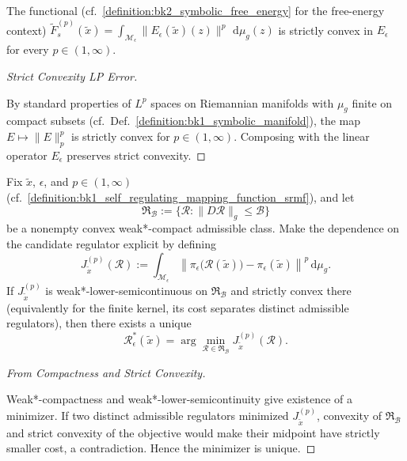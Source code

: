 \begin{lemma}
\label{lemma:bk7_coarsegrained_convexity}
The functional (cf.~\ref{definition:bk2_symbolic_free_energy} for the free-energy context)
\(
\tilde{F}_{s}^{(p)}(\tilde{x})
=\!\displaystyle \int_{\mathcal{M}_{\epsilon}}
\bigl\lVert E_{\epsilon}(\tilde{x})(z)\bigr\rVert^{p}\,
\,\mathrm{d}\mu_{g}(z)
\)
is strictly convex in $E_{\epsilon}$ for every $p\!\in\!(1,\infty)$.
\end{lemma}
\begin{proof}[Strict Convexity LP Error]
\label{proof:bk7_strict_convexity_lp_error}
\leavevmode

By standard properties of $L^{p}$ spaces on Riemannian manifolds with
$\mu_{g}$ finite on compact subsets (cf.~Def.~\ref{definition:bk1_symbolic_manifold}), the map
$E\!\mapsto\!\lVert E\rVert_{p}^{p}$ is strictly convex
for $p\!\in\!(1,\infty)$.  Composing with the linear operator
$E_{\epsilon}$ preserves strict convexity.
\end{proof}
\begin{lemma}
\label{lemma:bk7_budgetlimited_minimizer}
Fix $\tilde{x}$, $\epsilon$, and $p\in(1,\infty)$
(cf.~\ref{definition:bk1_self_regulating_mapping_function_srmf}), and let
\[
\mathfrak{R}_{\mathcal B}
:=\{\mathcal R:\lVert D\mathcal R\rVert_g\le\mathcal B\}
\]
be a nonempty convex weak*-compact admissible class.  Make the dependence on
the candidate regulator explicit by defining
\[
J_{\tilde{x}}^{(p)}(\mathcal R)
:=\int_{\mathcal M_\epsilon}
\left\lVert
\pi_\epsilon\!\bigl(\mathcal R(\tilde{x})\bigr)
-\pi_\epsilon(\tilde{x})
\right\rVert^p\,\mathrm d\mu_g.
\]
If $J_{\tilde{x}}^{(p)}$ is weak*-lower-semicontinuous on
$\mathfrak{R}_{\mathcal B}$ and strictly convex there (equivalently for the
finite kernel, its cost separates distinct admissible regulators), then there
exists a unique
\[
\mathcal{R}_{\epsilon}^{*}(\tilde{x})
=\arg\!\min_{\mathcal R\in\mathfrak R_{\mathcal B}}
J_{\tilde{x}}^{(p)}(\mathcal R).
\]
\end{lemma}
\begin{proof}[From Compactness and Strict Convexity]
\label{proof:bk7_from_compactness_and_convexity}
\leavevmode

Weak*-compactness and weak*-lower-semicontinuity give existence of a
minimizer.  If two distinct admissible regulators minimized
$J_{\tilde{x}}^{(p)}$, convexity of $\mathfrak R_{\mathcal B}$ and strict
convexity of the objective would make their midpoint have strictly smaller
cost, a contradiction.  Hence the minimizer is unique.
\end{proof}

